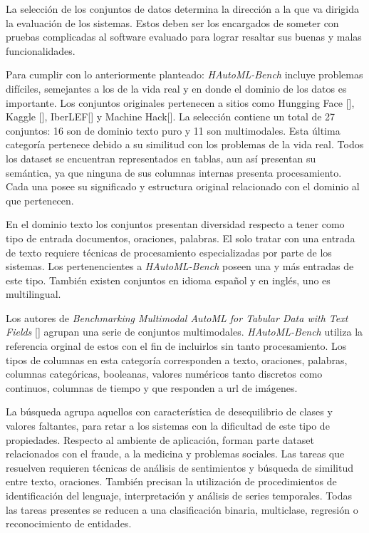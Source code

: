 La selección de los conjuntos de datos determina la dirección a la que va dirigida la evaluación de los sistemas. Estos deben ser los encargados de someter con 
pruebas complicadas al software evaluado para lograr resaltar sus buenas y malas funcionalidades.

Para cumplir con lo anteriormente planteado: \textit{HAutoML-Bench} incluye problemas difíciles, semejantes a los de la vida real y en donde el dominio de los datos 
es importante. Los conjuntos originales pertenecen a sitios como Hungging Face [\cite{67}], Kaggle [\cite{44}], IberLEF[\cite{68}] y Machine Hack[\cite{69}]. La 
selección contiene un total de 27 conjuntos: 16 son de dominio texto puro y 11 son multimodales. Esta última categoría pertenece debido a su similitud con los 
problemas de la vida real. Todos los dataset se encuentran representados en tablas, aun así presentan su semántica, ya que ninguna de sus columnas internas 
presenta procesamiento. Cada una posee su significado y estructura original relacionado con el dominio al que pertenecen.

En el dominio texto los conjuntos presentan diversidad respecto a tener como tipo de entrada documentos, oraciones, palabras. El solo tratar con una entrada de texto 
requiere técnicas de procesamiento especializadas por parte de los sistemas. Los pertenencientes a \textit{HAutoML-Bench} poseen una y más entradas de este tipo. 
También existen conjuntos en idioma español y en inglés, uno es multilingual.

Los autores de \textit{Benchmarking Multimodal AutoML for Tabular Data with Text Fields} [\cite{67}] agrupan una serie de conjuntos multimodales. \textit{HAutoML-Bench}
utiliza la referencia orginal de estos con el fin de incluirlos sin tanto procesamiento. Los tipos de columnas en esta categoría corresponden a texto, 
oraciones, palabras, columnas categóricas, booleanas, valores numéricos tanto discretos como continuos, columnas de tiempo y que responden a url de imágenes.

La búsqueda agrupa aquellos con característica de desequilibrio de clases y valores faltantes, para retar a los sistemas con la dificultad de este tipo de 
propiedades. Respecto al ambiente de aplicación, forman parte dataset relacionados con el fraude, a la medicina y problemas sociales. Las tareas que resuelven 
requieren técnicas de análisis de sentimientos y búsqueda de similitud entre texto, oraciones. También precisan la utilización de procedimientos de identificación 
del lenguaje, interpretación y análisis de series temporales. Todas las tareas presentes se reducen a una clasificación binaria, multiclase, regresión o 
reconocimiento de entidades.

